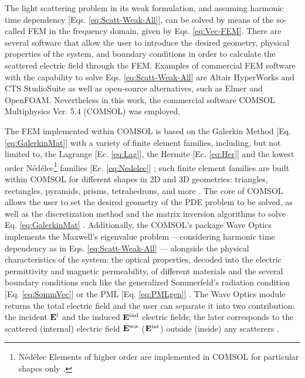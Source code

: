 
The light scattering problem in its weak formulation, and assuming harmonic time dependency [Eqs. \eqref{eq:Scatt-Weak-All}], can be solved by means of the so-called FEM in the frequency domain, given by Eqs. \eqref{eq:Vec-FEM}. There are several software that allow the user to introduce the desired geometry, physical properties of the system, and boundary conditions in order to calculate the scattered electric field through the FEM. Examples of commercial FEM software with the capability to solve Eqs. \eqref{eq:Scatt-Weak-All} are Altair HyperWorks and CTS StudioSuite as well as open-source alternatives, such as Elmer and OpenFOAM. Nevertheless in this work, the commercial software COMSOL Multiphysics\texttrademark{} Ver. 5.4 (COMSOL) was employed.

The FEM implemented within COMSOL is based on the Galerkin Method [Eq. \eqref{eq:GalerkinMat}] with a variety of finite element families, including, but not limited to, the Lagrange [Ec. \eqref{eq:Lag}], the Hermite [Ec. \eqref{eq:Her}] and the lowest order Nédélec\footnote{Nédélec Elements of higher order are implemented in COMSOL for particular shapes only \cite{comsol_doc}.} families [Ec. \eqref{eq:Nedelec}] \cite{comsol_doc}; such finite element families are built within COMSOL for different shapes in 2D and 3D geometries: triangles, rectangles, pyramids,  prisms, tetrahedrons, and more \cite{comsol_doc}. The core of COMSOL allows the user to set the desired geometry of the PDE problem to be solved, as well as the discretization method and the matrix inversion algorithms to solve Eq. \eqref{eq:GalerkinMat} \cite{comsol_doc}. Additionally, the COMSOL's package Wave Optics implements the Maxwell's eigenvalue problem ---considering harmonic time dependency as in Eqs. \eqref{eq:Scatt-Weak-All} \cite{comsol_doc}--- alongside the physical characteristics of the system: the optical properties, decoded into the electric permittivity and magnetic permeability, of different materials and the several boundary conditions such like the generalized Sommerfeld's radiation condition [Eq. \eqref{eq:SommVec}] or the PML [Eq. \eqref{eq:PMLgen}] \cite{comsol_wave}. The Wave Optics module returns the total electric field and the user can separate it into two contribution: the incident  $\vb{E}^\text{i}$ and the induced  $\vb{E}^\text{ind}$ electric fields; the later corresponds to the scattered (internal) electric field  $\vb{E}^\text{sca}$ ($\vb{E}^\text{int}$) outside (inside) any scatterers \cite{comsol_wave}.

